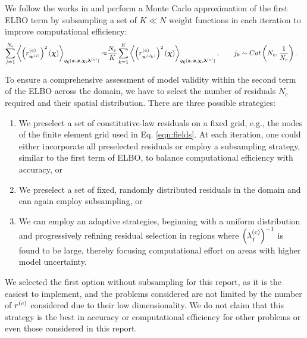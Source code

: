 We follow the works in \cite{scholz2025weak} and perform a Monte Carlo approximation of the first ELBO term by subsampling a set of $K \ll N$ weight functions in each iteration to improve computational efficiency:
\begin{align}
    \sum_{j=1}^{N_e} \left< \left(r^{(e)}_{\boldsymbol{w}^{(j)}} \right)^2 (\boldsymbol{\chi}) \right>_{q_{\boldsymbol{\xi}}(\boldsymbol{z}, \boldsymbol{x}, \boldsymbol{\chi}, \boldsymbol{\lambda}^{(c)})} \approx & \frac{{N_e}}{K} \sum_{k=1}^K \left< \left(r^{(e)}_{\boldsymbol{w}^{(j_k)}} \right)^2 (\boldsymbol{\chi}) \right>_{q_{\boldsymbol{\xi}}(\boldsymbol{z}, \boldsymbol{x}, \boldsymbol{\chi}, \boldsymbol{\lambda}^{(c)})}, \qquad j_k \sim Cat\left({N_e}, \frac{1}{{N_e}} \right). 
    \label{eqn:approx_virt_like}
\end{align}

To ensure a comprehensive assessment of model validity within the second term of the ELBO across the domain, we have to select the number of residuals $N_c$ required and their spatial distribution. There are three possible strategies:
\begin{enumerate}
    \item We preselect a set of constitutive-law residuals on a fixed grid, e.g., the nodes of the finite element grid used in Eq. \ref{eqn:fields}. At each iteration, one could either incorporate all preselected residuals or employ a subsampling strategy, similar to the first term of ELBO, to balance computational efficiency with accuracy, or
    \item We preselect a set of fixed, randomly distributed residuals in the domain and can again employ subsampling, or
    \item We can employ an adaptive strategies, beginning with a uniform distribution and progressively refining residual selection in regions where $\left(\lambda^{(c)}_j\right)^{-1}$ is found to be large, thereby focusing computational effort on areas with higher model uncertainty.
\end{enumerate}
We selected the first option without subsampling for this report, as it is the easiest to implement, and the problems considered are not limited by the number of $r^{(c)}$ considered due to their low dimensionality. We do not claim that this strategy is the best in accuracy or computational efficiency for other problems or even those considered in this report.


